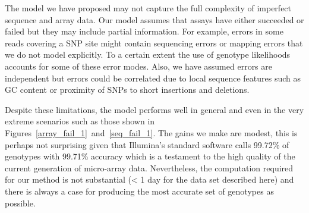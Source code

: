 The model we have proposed may not capture the full complexity of imperfect sequence and array data. Our model assumes that assays have either succeeded or failed but they may include partial information. For example, errors in some reads covering a SNP site might contain sequencing errors or mapping errors that we do not model explicitly. To a certain extent the use of genotype likelihoods accounts for some of these error modes. Also, we have assumed errors are independent but errors could be correlated due to local sequence features such as GC content or proximity of SNPs to short insertions and deletions. 

Despite these limitations, the model performs well in general and even in the very extreme scenarios such as those shown in Figures~\ref{array_fail_1}~and~\ref{seq_fail_1}.  The gains we make are modest,  this is perhaps not surprising given that Illumina's standard software calls 99.72\% of genotypes with 99.71\% accuracy which is a testament to the high quality of the current generation of micro-array data.  Nevertheless, the computation required for our method is not substantial (< 1 day for the data set described here) and there is always a case for producing the most accurate set of genotypes as possible.



